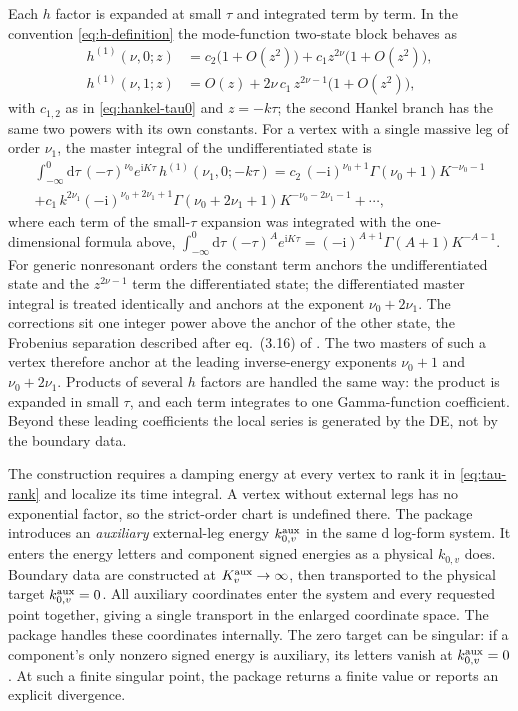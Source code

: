 \documentclass[11pt,a4paper]{article}
\numberwithin{table}{section}
\newcommand{\nn}{\nonumber}
\newcommand{\nd}{\mathrm{d}}
\newcommand{\ii}{\mathrm i}
\begin{document}
Each $h$ factor is expanded at small $\tau$ and integrated term by term. In the convention
\eqref{eq:h-definition} the mode-function two-state block behaves as
\begin{align}
  h^{(1)}(\nu,0;z)&=c_2\bigl(1+O(z^2)\bigr)+c_1z^{2\nu}\bigl(1+O(z^2)\bigr),\nn\\
  h^{(1)}(\nu,1;z)&=O(z)+2\nu\,c_1\,z^{2\nu-1}\bigl(1+O(z^2)\bigr),
  \label{eq:h-two-powers}
\end{align}
with $c_{1,2}$ as in \eqref{eq:hankel-tau0} and $z=-k\tau$; the second Hankel branch has the
same two powers with its own constants. For a vertex with a single massive leg of order
$\nu_1$, the master integral of the undifferentiated state is
\begin{multline}
  \int_{-\infty}^0\nd\tau\,(-\tau)^{\nu_0}e^{\ii K\tau}\,h^{(1)}(\nu_1,0;-k\tau)
  =c_2\,(-\ii)^{\nu_0+1}\Gamma(\nu_0+1)K^{-\nu_0-1}\\
  +c_1\,k^{2\nu_1}(-\ii)^{\nu_0+2\nu_1+1}\Gamma(\nu_0+2\nu_1+1)K^{-\nu_0-2\nu_1-1}
  +\cdots,
  \label{eq:boundary-example}
\end{multline}
where each term of the small-$\tau$ expansion was integrated with the one-dimensional formula
above, $\int_{-\infty}^0\nd\tau\,(-\tau)^{A}e^{\ii K\tau}=(-\ii)^{A+1}\Gamma(A+1)K^{-A-1}$. For
generic nonresonant orders the constant term anchors the undifferentiated state and the
$z^{2\nu-1}$ term the differentiated state; the differentiated master integral is treated
identically and anchors at the exponent $\nu_0+2\nu_1$. The corrections sit one integer power
above the anchor of the other state, the Frobenius separation described after eq.~(3.16) of
\cite{Chen:2024glu}. The two masters of such a vertex therefore anchor at the leading
inverse-energy exponents $\nu_0+1$ and $\nu_0+2\nu_1$. Products
of several $h$ factors are handled the same way: the product is expanded in small $\tau$, and
each term integrates to one Gamma-function coefficient. Beyond these leading coefficients the
local series is generated by the DE, not by the boundary data.

The construction requires a damping energy at every vertex to rank it in \eqref{eq:tau-rank}
and localize its time integral. A vertex without external legs has no exponential factor,
so the strict-order chart is undefined there. The package introduces an \emph{auxiliary}
external-leg energy $k_{0,v}^{\rm aux}$ in the same d log-form system. It enters the energy letters
and component signed energies as a physical $k_{0,v}$ does. Boundary data are constructed at
$K_v^{\rm aux}\to\infty$, then transported to the physical target $k_{0,v}^{\rm aux}=0$.
All auxiliary coordinates enter the system and every requested point together, giving a single
transport in the enlarged coordinate space. The package handles these coordinates internally.
The zero target can be singular: if a component's only nonzero signed energy is auxiliary,
its letters vanish at $k_{0,v}^{\rm aux}=0$. At such a finite singular point, the package
returns a finite value or reports an explicit divergence.
\end{document}
